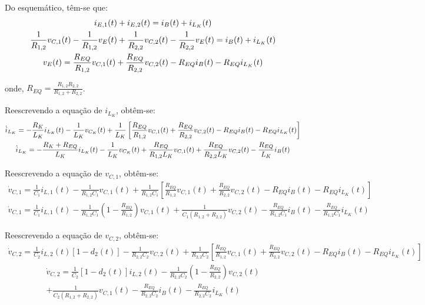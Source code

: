 \documentclass{article}
\newcommand{\ds}{\displaystyle}
\newcommand{\nle}{%
  \notag \\[0pt]
}
\begin{document}
Do esquemático, têm-se que:
\begin{gather}
  i_{E,1}(t) + i_{E,2}(t) = i_B(t) + i_{L_K}(t) \nle
  \frac{1}{R_{1,2}} v_{C,1}(t) - \frac{1}{R_{1,2}} v_E(t) + \frac{1}{R_{2,2}} v_{C,2}(t) - \frac{1}{R_{2,2}} v_E(t) =
  i_B(t) + i_{L_K}(t) \nle
  v_E(t) = \frac{R_{EQ}}{R_{1,2}} v_{C,1}(t) + \frac{R_{EQ}}{R_{2,2}} v_{C,2}(t) - R_{EQ} i_B(t) - R_{EQ} i_{L_K}(t)
\end{gather}

onde, $R_{EQ} = \ds \frac{R_{1,2}R_{2,2}}{R_{1,2} + R_{2,2}}$.

\vspace*{8pt}

Reescrevendo a equação de $i_{L_K}$, obtêm-se:
\begin{gather}
  \dot{i}_{L_K} =  - \frac{R_K}{L_K} i_{L_K}(t) - \frac{1}{L_K} v_{C_K}(t) + \frac{1}{L_K} \left[\frac{R_{EQ}}{R_{1,2}} v_{C,1}(t) + \frac{R_{EQ}}{R_{2,2}} v_{C,2}(t) - R_{EQ} i_B(t) - R_{EQ} i_{L_K}(t)\right] \nle
  \dot{i}_{L_K} =  - \frac{R_K + R_{EQ}}{L_K} i_{L_K}(t) - \frac{1}{L_K} v_{C_K}(t) + \frac{R_{EQ}}{R_{1,2} L_K} v_{C,1}(t) + \frac{R_{EQ}}{R_{2,2} L_K} v_{C,2}(t) - \frac{R_{EQ}}{L_K} i_B(t)
\end{gather}

Reescrevendo a equação de $v_{C,1}$, obtêm-se:
\begin{gather*}
  \dot{v}_{C,1} = \frac{1}{C_1} i_{L,1}(t) - \frac{1}{R_{1,2}C_1} v_{C,1}(t) + \frac{1}{R_{1,2} C_1} \left[\frac{R_{EQ}}{R_{1,2}} v_{C,1}(t) + \frac{R_{EQ}}{R_{2,2}} v_{C,2}(t) - R_{EQ} i_B(t) - R_{EQ} i_{L_K}(t)\right]
\end{gather*}
\begin{gather}
  \dot{v}_{C,1} = \frac{1}{C_1} i_{L,1}(t) - \frac{1}{R_{1,2}C_1} \left(1  - \frac{R_{EQ}}{R_{1,2}}\right) v_{C,1}(t) +\frac{1}{C_1 (R_{1,2} + R_{2,2})} v_{C,2}(t) - \frac{R_{EQ}}{R_{1,2}C_1} i_B(t) - \frac{R_{EQ}}{R_{1,2}C_1} i_{L_K}(t)
\end{gather}

Reescrevendo a equação de $v_{C,2}$, obtêm-se:
\begin{gather*}
  \dot{v}_{C,2} = \frac{1}{C_2} i_{L,2}(t) \left[1 - d_2(t)\right] - \frac{1}{R_{2,2} C_2} v_{C,2}(t) + \frac{1}{R_{2,2} C_2} \left[\frac{R_{EQ}}{R_{1,2}} v_{C,1}(t) + \frac{R_{EQ}}{R_{2,2}} v_{C,2}(t) - R_{EQ} i_B(t) - R_{EQ} i_{L_K}(t)\right]
\end{gather*}
\begin{multline}
  \dot{v}_{C,2} = \frac{1}{C_2} \left[1 - d_2(t)\right] i_{L,2}(t)
  - \frac{1}{R_{2,2} C_2} \left(1 - \frac{R_{EQ}}{R_{2,2}}\right) v_{C,2}(t)\\
  + \frac{1}{C_2 (R_{1,2} + R_{2,2})} v_{C,1}(t)
  - \frac{R_{EQ}}{R_{2,2}C_2} i_B(t) - \frac{R_{EQ}}{R_{2,2}C_2} i_{L_K}(t)
\end{multline}
\end{document}
